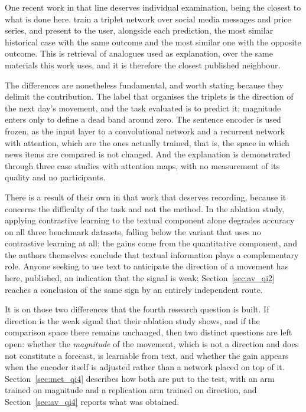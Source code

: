 One recent work in that line deserves individual examination, being the closest to what is done
here. \textcite{du2024contrastive} train a triplet network over social media messages and price
series, and present to the user, alongside each prediction, the most similar historical case with
the same outcome and the most similar one with the opposite outcome. This is retrieval of analogues
used as explanation, over the same materials this work uses, and it is therefore the closest
published neighbour.

The differences are nonetheless fundamental, and worth stating because they delimit the
contribution. The label that organises the triplets is the direction of the next day's movement,
and the task evaluated is to predict it; magnitude enters only to define a dead band around zero.
The sentence encoder is used frozen, as the input layer to a convolutional network and a recurrent
network with attention, which are the ones actually trained, that is, the space in which news
items are compared is not changed. And the explanation is demonstrated through three case studies
with attention maps, with no measurement of its quality and no participants.

There is a result of their own in that work that deserves recording, because it concerns the
difficulty of the task and not the method. In the ablation study, applying contrastive learning to
the textual component alone degrades accuracy on all three benchmark datasets, falling below the
variant that uses no contrastive learning at all; the gains come from the quantitative component,
and the authors themselves conclude that textual information plays a complementary role. Anyone
seeking to use text to anticipate the direction of a movement has here, published, an indication
that the signal is weak; Section~\ref{sec:av_qi2} reaches a conclusion of the same sign by an
entirely independent route.

It is on those two differences that the fourth research question is built. If direction is the
weak signal that their ablation study shows, and if the comparison space there remains
unchanged, then two distinct questions are left open: whether the \emph{magnitude} of the
movement, which is not a direction and does not constitute a forecast, is learnable from
text, and whether the gain appears when the encoder itself is adjusted rather than a network
placed on top of it. Section~\ref{sec:met_qi4} describes how both are put to the test, with an
arm trained on magnitude and a replication arm trained on direction, and
Section~\ref{sec:av_qi4} reports what was obtained.

